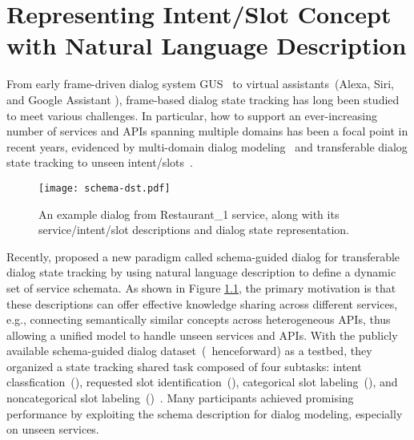 
\chapter{Representing Intent/Slot Concept with Natural Language Description}
\label{chaper:sgd}
From early frame-driven dialog system GUS~\cite{bobrow1977gus} to
virtual assistants~(Alexa, Siri, and Google Assistant \etal),
frame-based dialog state tracking has long been studied to meet
various challenges. In particular, how to support an ever-increasing
number of services and APIs spanning multiple domains has been a focal
point in recent years, evidenced by multi-domain dialog
modeling~\cite{budzianowski2018multiwoz,byrne2019taskmaster,
  shah-etal-2018-bootstrapping} and transferable dialog state tracking
to unseen intent/slots~\cite{mrkvsic2017neural,
  wu2019transferable, hosseini2020simple}.
\begin{figure}[!ht]
\centering
  \texttt{[image: schema-dst.pdf]}
  \caption{\label{fig:schema-dst} An example dialog from Restaurant\_1 service, along with its service/intent/slot descriptions and dialog state representation.}
\end{figure}

Recently, \citet{rastogi2019towards} proposed a new paradigm called
schema-guided dialog for transferable dialog state tracking by using
natural language description to define a dynamic set of service
schemata. As shown in Figure \ref{fig:schema-dst}, the primary
motivation is that these descriptions can offer effective knowledge
sharing across different services, e.g., connecting semantically
similar concepts across heterogeneous APIs, thus allowing a unified
model to handle unseen services and APIs. With the publicly available
schema-guided dialog dataset~(\sgdst~henceforward) as a
testbed, they organized a state tracking shared task composed of four subtasks:
intent classfication~(\IC), requested slot identification~(\RSI),
categorical slot labeling~(\CSL), and noncategorical slot
labeling~(\NSL)~\cite{rastogi2020schema}. Many participants achieved
promising performance by exploiting the schema description for dialog
modeling, especially on unseen services.

